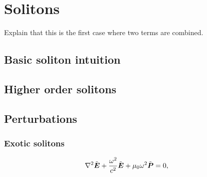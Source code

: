 \chapter{Solitons}
\label{ch:Solitons}

Explain that this is the first case where two terms are combined.

\section{Basic soliton intuition}

\section{Higher order solitons}

\section{Perturbations}

\subsection{Exotic solitons}

\begin{align}
    \nabla^{2}\tilde{\boldsymbol{E}}+\frac{\omega^{2}}{c^{2}}\tilde{\boldsymbol{E}}+\text{\ensuremath{\mu_{0}}}\omega^{2}\tilde{\boldsymbol{P}}&=0,
\end{align}